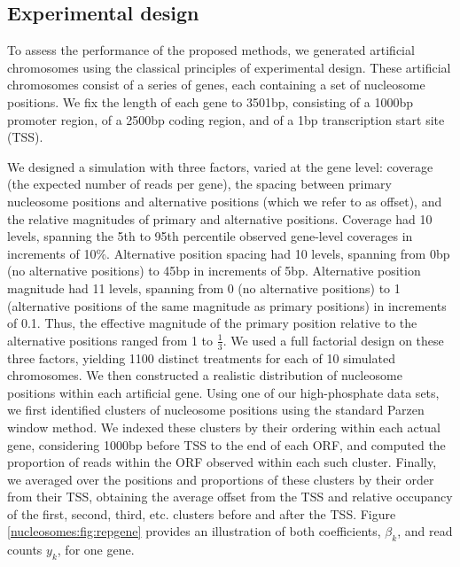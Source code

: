 \subsection{Experimental design}
\label{nucleosomes:sec:design}

To assess the performance of the proposed methods, we generated  artificial chromosomes using the classical principles of experimental design.
These artificial chromosomes consist of a series of genes, each containing a set of nucleosome positions.
We fix the length of each gene to 3501bp, consisting of a 1000bp promoter region, of a 2500bp coding region, and of a 1bp transcription start site (TSS).

We designed a simulation with three factors, varied at the gene level: coverage (the expected number of reads per gene), the spacing between primary nucleosome positions and alternative positions (which we refer to as offset), and the relative magnitudes of  primary and alternative positions.
Coverage had 10 levels, spanning the 5th to 95th percentile observed gene-level coverages in increments of 10\%.
Alternative position spacing had 10 levels, spanning from 0bp (no alternative positions) to 45bp in increments of 5bp.
Alternative position magnitude had 11 levels, spanning from 0 (no alternative positions) to 1 (alternative positions of the same magnitude as primary positions) in increments of 0.1.
Thus, the effective magnitude of the primary position relative to the alternative positions ranged from 1 to $\frac{1}{3}$.
We used a full factorial design on these three factors, yielding 1100 distinct treatments for each of 10 simulated chromosomes.
%
We then constructed a realistic distribution of nucleosome positions within each artificial gene.
Using one of our high-phosphate data sets, we first identified clusters of nucleosome positions using the standard Parzen window method.
We indexed these clusters by their ordering within each actual gene, considering 1000bp before TSS to the end of each ORF, and computed the proportion of reads within the ORF observed within each such cluster.
Finally, we averaged over the positions and proportions of these clusters by their order from their TSS, obtaining the average offset from the TSS and relative occupancy of the first, second, third, etc. clusters before and after the TSS.
Figure \ref{nucleosomes:fig:repgene} provides an illustration of both coefficients, $\beta_k$, and read counts $y_k$, for one gene.

